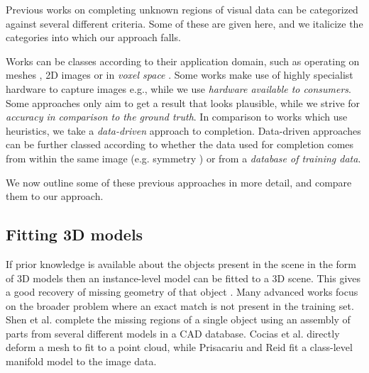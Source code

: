 \documentclass[10pt,twocolumn,letterpaper]{article}
\makeatletter
\renewcommand*{\eg}{e.g.\@\xspace}
\newcommand*{\ea}{et al.\@\xspace}
\makeatother
\begin{document}


Previous works on completing unknown regions of visual data can be categorized against several different criteria.
Some of these are given here, and we italicize the categories into which our approach falls.

Works can be classes according to their application domain, such as operating on meshes \cite{harary-tog-2013, schnabel-eurographics-2009}, 2D images \cite{gupta-cvpr-2011} or in \emph{voxel space} \cite{kim-iccv-2013}.
Some works make use of highly specialist hardware to capture images \eg \cite{velten-nature-2012}, while we use \emph{hardware available to consumers}.
Some approaches only aim to get a result that looks plausible, while we strive for \emph{accuracy in comparison to the ground truth}.
In comparison to works which use heuristics, we take a \emph{data-driven} approach to completion.
Data-driven approaches can be further classed according to whether the data used for completion comes from within the same image (\eg symmetry \cite{kroemer-humanoids-2012}) or from a \emph{database of training data}.

We now outline some of these previous approaches in more detail, and compare them to our approach.

\subsection{Fitting 3D models}
If prior knowledge is available about the objects present in the scene in the form of 3D models then an instance-level model can be fitted to a 3D scene.
This gives a good recovery of missing geometry of that object \cite{hinterstoisser-accv-2012, drost-3dimpvt-2012}.
Many advanced works focus on the broader problem where an exact match is not present in the training set.
Shen \ea \cite{shen-tog-2012} complete the missing regions of a single object using an assembly of parts from several different models in a CAD database.
Cocias \ea \cite{cocias-cgvcv-2013} directly deform a mesh to fit to a point cloud, while Prisacariu and Reid \cite{prisacariu-iccv-2011} fit a class-level manifold model to the image data.
\end{document}
